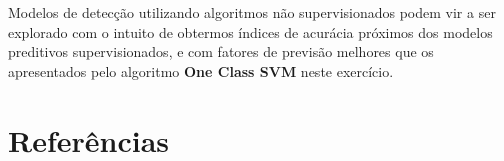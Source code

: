 \documentclass[twoside]{article}
\begin{document}
Modelos de detecção utilizando algoritmos não supervisionados podem vir a ser explorado com o intuito de obtermos índices de acurácia próximos dos modelos preditivos supervisionados, e com fatores de previsão melhores que os apresentados pelo algoritmo \textbf{One Class SVM} neste exercício.

\footnotesize{
    \printnoidxglossary[type=acronym]
    \printnoidxglossary[type=main]
}\normalsize

\section{Referências}

    
    \begingroup
        \renewcommand{\section}[2]{}
        \footnotesize{
            
        }\normalsize
    \endgroup
\end{document}
